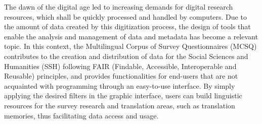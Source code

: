 The dawn of the digital age led to increasing demands for digital research resources, which shall be quickly processed and handled by computers. Due to the amount of data created by this digitization process, the design of tools that enable the analysis and management of data and metadata has become a relevant topic. In this context, the Multilingual Corpus of Survey Questionnaires (MCSQ) contributes to the creation and distribution of data for the Social Sciences and Humanities (SSH) following FAIR (Findable, Accessible, Interoperable and Reusable) principles, and provides functionalities for end-users that are not acquainted with programming through an easy-to-use interface. By simply applying the desired filters in the graphic interface, users can build linguistic resources for the survey research and translation areas, such as translation memories, thus facilitating data access and usage.
